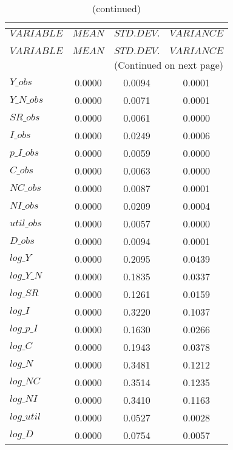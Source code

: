  
\begin{center}
\begin{longtable}{lccc} 
\caption{THEORETICAL MOMENTS}\\
 \label{Table:th_moments}\\
\toprule 
$VARIABLE   $	 & 	 $         MEAN$	 & 	 $    STD. DEV.$	 & 	 $     VARIANCE$\\
\midrule \endfirsthead 
\caption{(continued)}\\
 \toprule \\ 
$VARIABLE   $	 & 	 $         MEAN$	 & 	 $    STD. DEV.$	 & 	 $     VARIANCE$\\
\midrule \endhead 
\midrule \multicolumn{4}{r}{(Continued on next page)} \\ \bottomrule \endfoot 
\bottomrule \endlastfoot 
$Y\_obs     $	 & 	       0.0000	 & 	       0.0094	 & 	       0.0001 \\ 
$Y\_N\_obs  $	 & 	       0.0000	 & 	       0.0071	 & 	       0.0001 \\ 
$SR\_obs    $	 & 	       0.0000	 & 	       0.0061	 & 	       0.0000 \\ 
$I\_obs     $	 & 	       0.0000	 & 	       0.0249	 & 	       0.0006 \\ 
$p\_I\_obs  $	 & 	       0.0000	 & 	       0.0059	 & 	       0.0000 \\ 
$C\_obs     $	 & 	       0.0000	 & 	       0.0063	 & 	       0.0000 \\ 
$NC\_obs    $	 & 	       0.0000	 & 	       0.0087	 & 	       0.0001 \\ 
$NI\_obs    $	 & 	       0.0000	 & 	       0.0209	 & 	       0.0004 \\ 
$util\_obs  $	 & 	       0.0000	 & 	       0.0057	 & 	       0.0000 \\ 
$D\_obs     $	 & 	       0.0000	 & 	       0.0094	 & 	       0.0001 \\ 
$log\_Y     $	 & 	       0.0000	 & 	       0.2095	 & 	       0.0439 \\ 
$log\_Y\_N  $	 & 	       0.0000	 & 	       0.1835	 & 	       0.0337 \\ 
$log\_SR    $	 & 	       0.0000	 & 	       0.1261	 & 	       0.0159 \\ 
$log\_I     $	 & 	       0.0000	 & 	       0.3220	 & 	       0.1037 \\ 
$log\_p\_I  $	 & 	       0.0000	 & 	       0.1630	 & 	       0.0266 \\ 
$log\_C     $	 & 	       0.0000	 & 	       0.1943	 & 	       0.0378 \\ 
$log\_N     $	 & 	       0.0000	 & 	       0.3481	 & 	       0.1212 \\ 
$log\_NC    $	 & 	       0.0000	 & 	       0.3514	 & 	       0.1235 \\ 
$log\_NI    $	 & 	       0.0000	 & 	       0.3410	 & 	       0.1163 \\ 
$log\_util  $	 & 	       0.0000	 & 	       0.0527	 & 	       0.0028 \\ 
$log\_D     $	 & 	       0.0000	 & 	       0.0754	 & 	       0.0057 \\ 
\end{longtable}
 \end{center}
